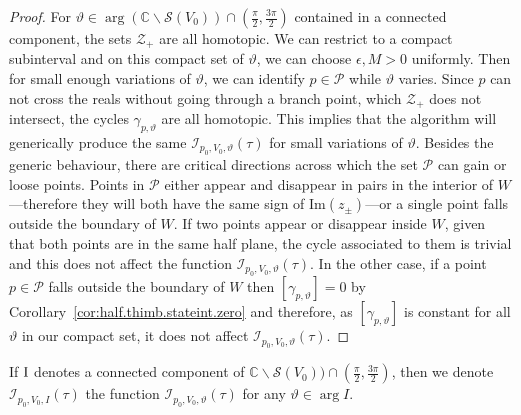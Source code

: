 \documentclass[12pt,reqno]{amsart}
\theoremstyle{definition}
\def\BC{\mathbb C}
\def\calI{\mathcal I}
\def\calP{\mathcal P}
\def\calS{\mathcal S}
\def\calZ{\mathcal Z}
\def\Im{\mathrm{Im}}
\renewcommand{\=}{\;=\;}
\begin{document}
\begin{proof}
For $\vartheta\in\arg(\BC\backslash\calS(V_{0}))\cap(\tfrac{\pi}{2},\tfrac{3\pi}{2})$ contained in a connected component, the sets $\calZ_{+}$ are all homotopic. We can restrict to a compact subinterval and on this compact set of $\vartheta$, we can choose $\epsilon,M>0$ uniformly. Then for small enough variations of $\vartheta$, we can identify $p\in\calP$ while $\vartheta$ varies. Since $p$ can not cross the reals without going through a branch point, which $\calZ_+$ does not intersect, the cycles $\gamma_{p,\vartheta}$ are all homotopic. This implies that the algorithm will generically produce the same $\calI_{p_0,V_0,\vartheta}(\tau)$ for small variations of $\vartheta$. Besides the generic behaviour, there are critical directions across which the set $\calP$ can gain or loose points. Points in $\calP$ either appear and disappear in pairs in the interior of $W$---therefore they will both have the same sign of $\Im(z_\pm)$---or a single point falls outside the boundary of $W$.
If two points appear or disappear inside $W$, given that both points are in the same half plane, the cycle associated to them is trivial and this does not affect the function $\calI_{p_0,V_0,\vartheta}(\tau)$. In the other case, if a point $p\in\calP$ falls outside the boundary of $W$ then $[\gamma_{p,\vartheta}]=0$ by Corollary~\ref{cor:half.thimb.stateint.zero} and therefore, as $[\gamma_{p,\vartheta}]$ is constant for all $\vartheta$ in our compact set, it does not affect $\calI_{p_0,V_0,\vartheta}(\tau)$. 
\end{proof}
If $\rm I$ denotes a connected component of $\BC\backslash\calS(V_{0}))\cap(\tfrac{\pi}{2},\tfrac{3\pi}{2})$, then we denote $\calI_{p_0,V_0,I}(\tau)$ the function $\calI_{p_0,V_0,\vartheta}(\tau)$ for any $\vartheta\in\arg{I}$. 
\end{document}
